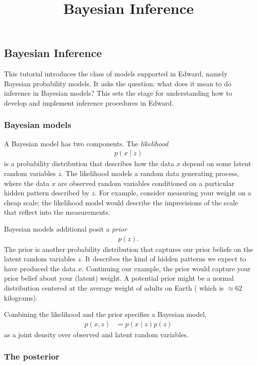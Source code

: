 \title{Bayesian Inference}

\subsection{Bayesian Inference}

This tutorial introduces the class of models supported in Edward, namely
Bayesian probability models. It asks the question: what does it mean to do
inference in Bayesian models? This sets the stage for
understanding how to develop and implement inference procedures in Edward.

\subsubsection{Bayesian models}

A Bayesian model has two components. The \emph{likelihood}
\begin{align*}
  p(x \mid z)
\end{align*}
is a probability distribution that describes how the data $x$ depend on some
latent random variables $z$. The likelihood models a random data generating
process, where the data $x$ are observed random variables conditioned on a
particular hidden pattern described by $z$. For example, consider measuring your
weight on a cheap scale; the likelihood model would describe the imprecisions
of the scale that reflect into the measurements.

Bayesian models additional posit a \emph{prior}
\begin{align*}
  p(z).
\end{align*}
The prior is another probability distribution that captures our prior beliefs on
the latent random variables $z$. It describes the kind of hidden patterns we
expect to have produced the data $x$. Continuing our example, the prior would
capture your prior belief about your (latent) weight. A potential prior might be
a normal distribution centered at the average weight of adults on Earth (
which is $\approx62$ kilograms).

Combining the likelihood and the prior specifies a Bayesian model,
\begin{align*}
  p(x,z)
  &=
  p(x \mid z)
  p(z)
\end{align*}
as a joint density over observed and latent random variables. 

\subsubsection{The posterior}

